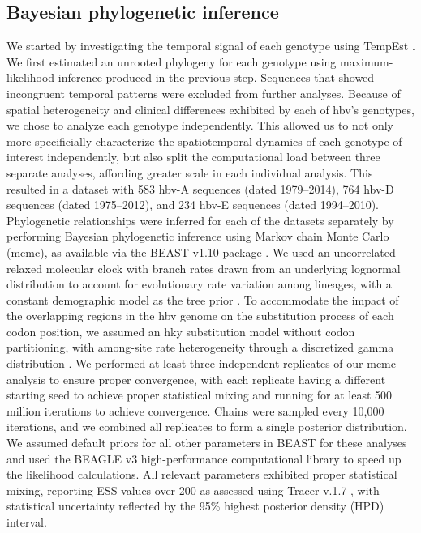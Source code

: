 \subsection{Bayesian phylogenetic inference}
We started by investigating the temporal signal of each genotype using TempEst \citep{rambaut2016exploring}.
We first estimated an unrooted phylogeny for each genotype using maximum-likelihood inference produced in the previous step.
Sequences that showed incongruent temporal patterns were excluded from further analyses.
Because of spatial heterogeneity and clinical differences exhibited by each of \gls{hbv}'s genotypes, we chose to analyze each genotype independently.
This allowed us to not only more specificially characterize the spatiotemporal dynamics of each genotype of interest independently, but also split the computational load between three separate analyses, affording greater scale in each individual analysis.
This resulted in a dataset with 583 \gls{hbv}-A sequences (dated 1979--2014), 764 \gls{hbv}-D sequences (dated 1975--2012), and 234 \gls{hbv}-E sequences (dated 1994--2010).
Phylogenetic relationships were inferred for each of the datasets separately by performing Bayesian phylogenetic inference using Markov chain Monte Carlo (\gls{mcmc}), as available via the BEAST v1.10 package \citep{suchard2018bayesian}.
We used an uncorrelated relaxed molecular clock with branch rates drawn from an underlying lognormal distribution to account for evolutionary rate variation among lineages, with a constant demographic model as the tree prior \citep{kingman_coalescent_1982,drummond_estimating_2002}.
To accommodate the impact of the overlapping regions in the \gls{hbv} genome on the substitution process of each codon position, we assumed an \gls{hky} substitution model \citep{hasegawa1985dating} without codon partitioning, with among-site rate heterogeneity through a discretized gamma distribution \citep{yang_maximum_1994}.
We performed at least three independent replicates of our \gls{mcmc} analysis to ensure proper convergence, with each replicate having a different starting seed to achieve proper statistical mixing and running for at least 500 million iterations to achieve convergence.
Chains were sampled every 10,000 iterations, and we combined all replicates to form a single posterior distribution.
We assumed default priors for all other parameters in BEAST for these analyses and used the BEAGLE v3 \citep{suchard_many-core_2009} high-performance computational library to speed up the likelihood calculations.
All relevant parameters exhibited proper statistical mixing, reporting ESS values over 200 as assessed using Tracer v.1.7 \citep{rambaut_posterior_2018}, with statistical uncertainty reflected by the 95\% highest posterior density (HPD) interval.\\

